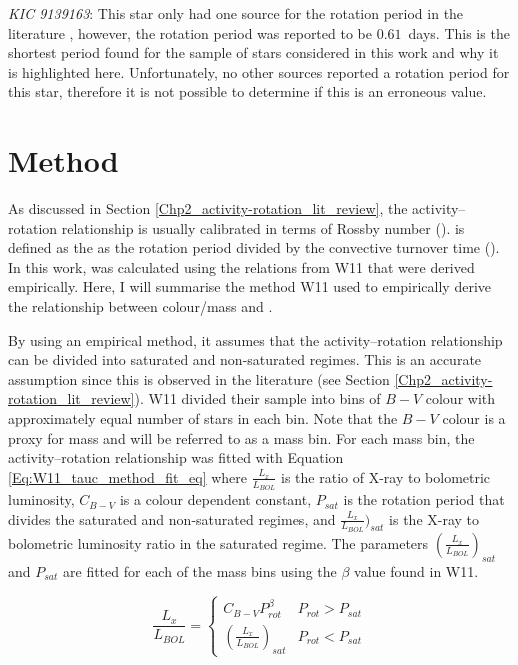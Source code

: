 \textit{KIC 9139163}: This star only had one source for the rotation period in the literature \citep{Janes_2017}, however, the rotation period was reported to be $0.61$~days. This is the shortest period found for the sample of stars considered in this work and why it is highlighted here. Unfortunately, no other sources reported a rotation period for this star, therefore it is not possible to determine if this is an erroneous value.

\section{Method}
\label{Chp5_method}

As discussed in Section \ref{Chp2_activity-rotation_lit_review}, the activity--rotation relationship is usually calibrated in terms of Rossby number (\Ro). \Ro is defined as the as the rotation period divided by the convective turnover time (\tauc). In this work, \tauc was calculated using the relations from W11 that were derived empirically. Here, I will summarise the method W11 used to empirically derive the relationship between colour/mass and \tauc.

By using an empirical method, it assumes that the activity--rotation relationship can be divided into saturated and non-saturated regimes. This is an accurate assumption since this is observed in the literature (see Section \ref{Chp2_activity-rotation_lit_review}). W11 divided their sample into bins of $B-V$ colour with approximately equal number of stars in each bin. Note that the $B-V$ colour is a proxy for mass and will be referred to as a mass bin. For each mass bin, the activity--rotation relationship was fitted with Equation \ref{Eq:W11_tauc_method_fit_eq} where $\frac{L_{x}}{L_{BOL}}$ is the ratio of X-ray to bolometric luminosity, $C_{B-V}$ is a colour dependent constant, $P_{sat}$ is the rotation period that divides the saturated and non-saturated regimes, and $\frac{L_{x}}{L_{BOL}})_{sat}$ is the X-ray to bolometric luminosity ratio in the saturated regime. The parameters $(\frac{L_{x}}{L_{BOL}})_{sat}$ and $P_{sat}$ are fitted for each of the mass bins using the $\beta$ value found in W11.

\begin{equation}
    \frac{L_{x}}{L_{BOL}} = 
    \begin{cases}
        C_{B-V}P_{rot}^{\beta} & P_{rot} > P_{sat} \\
        (\frac{L_{x}}{L_{BOL}})_{sat} & P_{rot} < P_{sat}
    \end{cases}
    \label{Eq:W11_tauc_method_fit_eq}
\end{equation}

